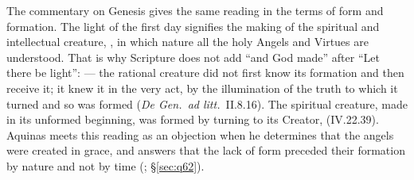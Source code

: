 The commentary on Genesis gives the same reading in the terms of form and
formation. The light of the first day signifies the making of the
spiritual and intellectual creature, , in which nature all the holy Angels
and Virtues are understood. That is why Scripture does not add ``and God
made'' after ``Let there be light'':  --- the rational creature did not first know its
formation and then receive it; it knew it in the very act, by the
illumination of the truth to which it turned and so was formed
(\emph{De Gen.\ ad litt.}\ II.8.16). The spiritual creature, made in its
unformed beginning, was formed by turning to its Creator,  (IV.22.39).
Aquinas meets this reading as an objection when he determines that the
angels were created in grace, and answers that the lack of form preceded
their formation by nature and not by time (; \S\ref{sec:q62}).

